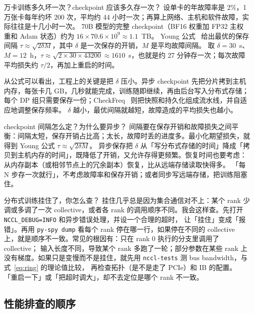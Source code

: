 \begin{est}{万卡训练多久坏一次？checkpoint 应该多久存一次？}
设单卡的年故障率是 2\%，1 万张卡每年约坏 200 次，平均约 44 小时一次；再算上网络、主机和软件故障，实际往往是十几小时一次。
70B 模型的完整 checkpoint（BF16 权重加 FP32 主权重和 Adam 状态）约为 $16\times70.6\times10^9\approx1.1$~TB。
Young 公式~\cite{young1974first} 给出最优的保存间隔 $\tau\approx\sqrt{2\delta M}$，其中 $\delta$ 是一次保存的开销，$M$ 是平均故障间隔。
取 $\delta=30$~s、$M=12$~h，$\tau\approx\sqrt{2\times30\times43200}\approx1610$~s，也就是约 27 分钟存一次；每次故障平均损失约 $\tau/2$，再加上重启的时间。
\end{est}

从公式可以看出，工程上的关键是把 $\delta$ 压小。异步 checkpoint 先把分片拷到主机内存，每张卡几 GB，几秒就能完成，训练随即继续，再由后台写入分布式存储；
每个 DP 组只需要保存一份；CheckFreq~\cite{mohan2021checkfreq} 则把快照和持久化组成流水线，并自适应地调整保存频率。
$\delta$ 越小，最优间隔就越短，故障造成的平均损失也越小。

\begin{qa}{checkpoint 间隔怎么定？为什么要异步？}
\ans 间隔要在保存开销和故障损失之间平衡：间隔太短，保存开销占比高；太长，故障时丢的进度多。最小化期望损失，就得到 Young 公式 $\tau\approx\sqrt{2\delta M}$。
异步保存把 $\delta$ 从「写分布式存储的时间」降成「拷贝到主机内存的时间」，既降低了开销，又允许存得更频繁。恢复时间也要考虑：从内存副本（或相邻节点上的冗余副本）恢复，比从远端存储读取快得多。
\wrong 「每 N 步存一次就行」，不考虑故障率和保存开销；或者同步写远端存储，把训练阻塞住。
\end{qa}

\begin{qa}{分布式训练挂住了，你怎么查？}
\ans 挂住几乎总是因为集合通信对不上：某个 rank 少调或多调了一次 collective，或者各 rank 的调用顺序不同。我会这样查。先打开 \texttt{NCCL\_DEBUG=INFO} 和异步错误处理，并设一个合理的超时，
让「挂住」变成「报错」。再用 \texttt{py-spy dump} 看每个 rank 停在哪一行，如果停在不同的 collective 上，就是顺序不一致。常见的根因有：只在 rank 0 执行的分支里调用了 collective；
输入长度不同，导致某个 rank 多跑了一轮；部分参数在某些 rank 上没有梯度。如果只是变慢而不是挂住，就先用 \texttt{nccl-tests} 测 bus bandwidth，与式~\eqref{eq:ring} 的理论值比较，
再检查拓扑（是不是走了 PCIe）和 IB 的配置。
\wrong 「重启一下」或「把超时调大」，却不去定位是哪个 rank 不一致。
\end{qa}

\subsection{性能排查的顺序}

